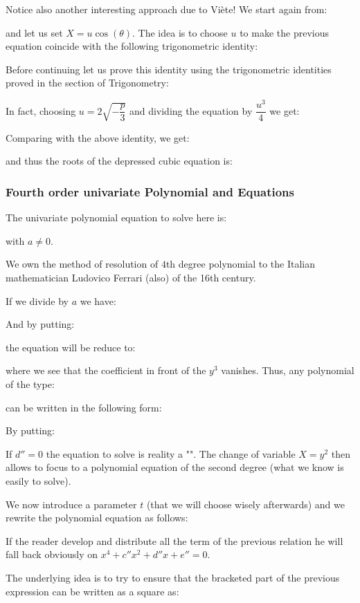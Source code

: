 	Notice also another interesting approach due to Viète! We start again from:
	
	and let us set $X = u\cos(\theta)$. The idea is to choose $u$ to make the previous equation coincide with the following trigonometric identity:
	
	Before continuing let us prove this identity using the trigonometric identities proved in the section of Trigonometry:
	
	In fact, choosing $u=2\sqrt{-{\dfrac {p}{3}}}$ and dividing the equation by $\dfrac{u^{3}}{4}$ we get:
	
	Comparing with the above identity, we get:
	
	and thus the roots of the depressed cubic equation is:
	
	
	\subsubsection{Fourth order univariate Polynomial and Equations}
	The univariate polynomial equation to solve here is:
	
	with $a\neq 0$.
	\begin{tcolorbox}[title=Remark,colframe=black,arc=10pt]
	We own the method of resolution of $4$th degree polynomial to the Italian mathematician Ludovico Ferrari (also) of the 16th century.
	\end{tcolorbox}
	If we divide by $a$ we have:
	
	And by putting:
	
	the equation will be reduce to:
	
	where we see that the coefficient in front of the $y^3$ vanishes. Thus, any polynomial of the type:
	
	can be written in the following form:
	
	By putting:
	
	\begin{tcolorbox}[title=Remark,colframe=black,arc=10pt]
	If $d''=0$ the equation to solve is reality a "". The change of variable $X=y^2$ then allows to focus to a polynomial equation of the second degree (what we know is easily to solve).
	\end{tcolorbox}
	We now introduce a parameter $t$ (that we will choose wisely afterwards) and we rewrite the polynomial equation as follows:
	
	\begin{tcolorbox}[title=Remark,colframe=black,arc=10pt]
	If the reader develop and distribute all the term of the previous relation he will fall back obviously on $x^4+c''x^2+d''x+e''=0$.
	\end{tcolorbox}
	The underlying idea is to try to ensure that the bracketed part of the previous expression can be written as a square as:
	
